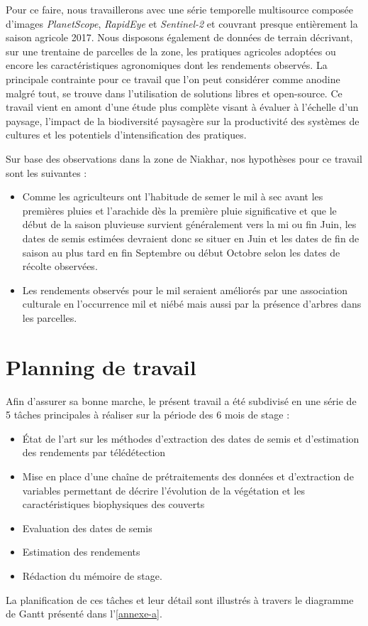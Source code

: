 \vspace{5mm} %

Pour ce faire, nous travaillerons avec une série temporelle multisource composée d'images \emph{PlanetScope}, \emph{RapidEye} et \emph{Sentinel-2} et couvrant presque entièrement 
la saison agricole 2017. Nous disposons également de données de terrain décrivant, sur une trentaine de parcelles de la zone, les pratiques agricoles adoptées ou encore les 
caractéristiques agronomiques dont les rendements observés. La principale contrainte pour ce travail que l'on peut considérer comme anodine malgré tout, se trouve dans l'utilisation 
de solutions libres et open-source. Ce travail vient en amont d'une étude plus complète visant à évaluer à l’échelle d’un paysage, l’impact de la biodiversité paysagère sur la productivité des 
systèmes de cultures et les potentiels d’intensification des pratiques.

\vspace{5mm} %

Sur base des observations dans la zone de Niakhar, nos hypothèses pour ce travail sont les suivantes :
  \begin{itemize}
   \item Comme les agriculteurs ont l'habitude de semer le mil à sec avant les premières pluies et l'arachide dès la première pluie significative et que le début de la saison pluvieuse survient généralement vers la mi ou fin Juin, les dates de semis estimées devraient donc se situer en Juin et les dates de fin de saison au plus tard en fin Septembre ou début Octobre selon les dates de récolte observées. 
   \item Les rendements observés pour le mil seraient améliorés par une association culturale en l'occurrence mil et niébé mais aussi par la présence d'arbres dans les parcelles.
  \end{itemize}

\section{Planning de travail}
Afin d'assurer sa bonne marche, le présent travail a été subdivisé en une série de 5 tâches principales à réaliser sur la période des 6 mois de stage :
  \begin{itemize}
   \item \'Etat de l'art sur les méthodes d'extraction des dates de semis et d'estimation des rendements par télédétection
   \item Mise en place d'une chaîne de prétraitements des données et d'extraction de variables permettant de décrire l’évolution de la végétation et les caractéristiques biophysiques des couverts 
   \item Evaluation des dates de semis
   \item Estimation des rendements
   \item Rédaction du mémoire de stage.
  \end{itemize}
La planification de ces tâches et leur détail sont illustrés \`a travers le diagramme de Gantt présenté dans l'\cref{annexe-a}.

